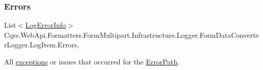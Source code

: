 \subsubsection{\texorpdfstring{Errors}{Errors}}
{\footnotesize\ttfamily List$<$\hyperlink{classCqrs_1_1WebApi_1_1Formatters_1_1FormMultipart_1_1Infrastructure_1_1Logger_1_1FormDataConverterLogger_1_1LogErrorInfo}{Log\+Error\+Info}$>$ Cqrs.\+Web\+Api.\+Formatters.\+Form\+Multipart.\+Infrastructure.\+Logger.\+Form\+Data\+Converter\+Logger.\+Log\+Item.\+Errors\hspace{0.3cm}{\ttfamily [get]}, {\ttfamily [set]}}



All \hyperlink{}{exceptions} or issues that occurred for the \hyperlink{classCqrs_1_1WebApi_1_1Formatters_1_1FormMultipart_1_1Infrastructure_1_1Logger_1_1FormDataConverterLogger_1_1LogItem_a300199a6b543a7a53b81b18aeb10652b_a300199a6b543a7a53b81b18aeb10652b}{Error\+Path}. 

